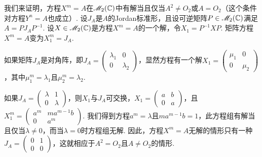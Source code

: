 \begin{solution}
  我们来证明，方程$X^m=A$在$\mathscr M_2(\mathbb C)$中有解当且仅当$A^2\ne O_2$或$A=O_2$（这个条件对方程$Y^n=A$也成立）. 设$J_A$是$A$的Jordan标准形，且设可逆矩阵$P\in\mathscr M_2(\mathbb C)$满足$A=PJ_AP^{-1}$. 设$X\in\mathscr M_2(\mathbb C)$是方程$X^m=A$的一个解，令$X_1=P^{-1}XP$. 矩阵方程$X^m=A$变为$X_1^m=J_A$.

  如果矩阵$J_A$是对角阵，即$J_A=\begin{pmatrix}
    \lambda_1 & 0 \\
    0 & \lambda_2
  \end{pmatrix}$，显然方程有一个解$X_1=\begin{pmatrix}
    \mu_1 & 0 \\
    0 & \mu_2
  \end{pmatrix}$，其中$\mu_1^m=\lambda_1$且$\mu_2^m=\lambda_2$.

  如果$J_A=\begin{pmatrix}
    \lambda & 1 \\
    0 & \lambda
  \end{pmatrix}$，则$X_1$与$J_A$可交换，$X_1=\begin{pmatrix}
    a & b \\
    0 & a
  \end{pmatrix}$，且$X_1^m=\begin{pmatrix}
    a^m & ma^{m-1}b \\
    0 & a^m
  \end{pmatrix}$. 我们得到方程$a^m=\lambda$且$ma^{m-1}b=1$，此方程组有解当且仅当$\lambda\ne0$，而当$\lambda=0$时方程组无解. 因此，方程$X^m=A$无解的情形只有一种$J_A=\begin{pmatrix}
    0 & 1 \\
    0 & 0
  \end{pmatrix}$，这就相应于$A^2=O_2$且$A\ne O_2$的情形.
\end{solution}

